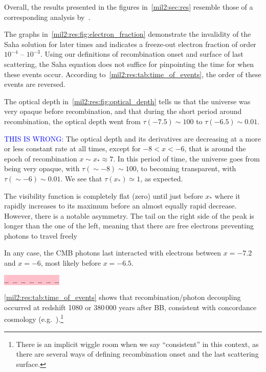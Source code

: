 


Overall, the results presented in the figures in~\cref{mil2:sec:res} resemble those of a corresponding analysis by~\citet[see][Fig.~1,~2]{Callin2006}.


The graphs in~\cref{mil2:res:fig:electron_fraction} demonstrate the invalidity of the Saha solution for later times and indicates a freeze-out electron fraction of order $10^{-4}$ -- $10^{-3}$. Using our definitions of recombination onset and surface of last scattering, the Saha equation does not suffice for pinpointing the time for when these events occur. According to~\cref{mil2:res:tab:time_of_events}, the order of these events are reversed. 

The optical depth in~\cref{mil2:res:fig:optical_depth} tells us that the universe was very opaque before recombination, and that during the short period around recombination, the optical depth went from $\tau(-7.5)\sim 100$ to $\tau( -6.5)\sim 0.01$.




\textcolor{blue}{THIS IS WRONG:}
The optical depth and its derivatives are decreasing at a more or less constant rate at all times, except for $-8 < x < -6$, that is around the epoch of recombination $x\sim x_*\approx 7$. In this period of time, the universe goes from being very opaque, with $\tau(\sim-8)\sim 100$, to becoming transparent, with $\tau(\sim -6)\sim 0.01$. We see that $\tau(x_*)\simeq 1$, as expected. 

The visibility function is completely flat (zero) until just before $x_*$ where it rapidly increases to its maximum before an almost equally rapid decrease. However, there is a notable asymmetry. The tail on the right side of the peak is longer than the one of the left, meaning that there are free electrons preventing photons to travel freely

In any case, the CMB photons last interacted with electrons between $x=-7.2$ and $x=-6$, most likely before $x=-6.5$.

\colorbox{pink}{\dots \, \dots \, \dots \, \dots \, \dots \, \dots \, \dots }


\cref{mil2:res:tab:time_of_events} shows that recombination/photon decoupling occurred at redshift 1080 or 380\,000 years after BB, consistent with concordance cosmology (e.g.~\citet[Tab.~3.1]{Baumann}).\footnote{There is an implicit wiggle room when we say ``consistent'' in this context, as there are several ways of defining recombination onset and the last scattering surface.} 
